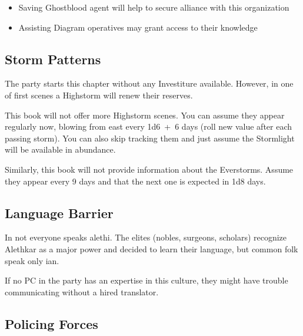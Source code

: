 \begin{itemize}
	\item Saving Ghostblood agent will help to secure alliance with this organization
	\item Assisting Diagram operatives may grant access to their knowledge
\end{itemize}



\subsection{Storm Patterns}

The party starts this chapter without any Investiture available. However, in one of first scenes a Highstorm will renew their reserves.

This book will not offer more Highstorm scenes. You can assume they appear regularly now, blowing from east every 1d6~+~6 days (roll new value after each passing storm). You can also skip tracking them and just assume the Stormlight will be available in abundance.

Similarly, this book will not provide information about the Everstorms. Assume they appear every 9 days and that the next one is expected in 1d8 days.



\subsection{Language Barrier}

In \locationKharbranth{} not everyone speaks alethi. The elites (nobles, surgeons, scholars) recognize Alethkar as a major power and decided to learn their language, but common folk speak only \locationKharbranth{}ian. 

If no PC in the party has an expertise in this culture, they might have trouble communicating without a hired translator.


\subsection{Policing Forces}

